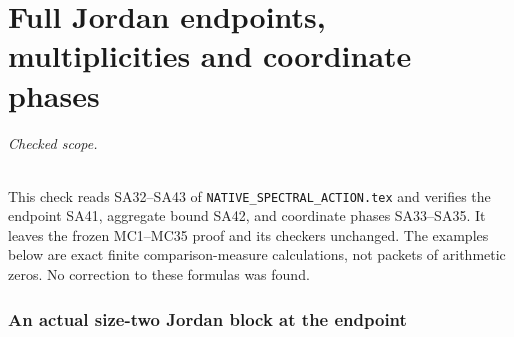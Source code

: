 \documentclass[11pt]{article}
\begin{document}
\endgroup

\clearpage\begingroup
\part*{Full Jordan endpoints, multiplicities and coordinate phases}
\newcommand{\saetr}{\operatorname{tr}}
\newcommand{\saeRes}{\operatorname{Res}}
\newcommand{\saeC}{\mathbb C}


\paragraph{Checked scope.}
This check reads SA32--SA43 of
\texttt{NATIVE\_SPECTRAL\_ACTION.tex} and verifies the endpoint
SA41, aggregate bound SA42, and coordinate phases SA33--SA35.
It leaves the frozen MC1--MC35 proof and its checkers unchanged.
The examples below are exact finite comparison-measure calculations,
not packets of arithmetic zeros. No correction to these formulas was found.

\section{An actual size-two Jordan block at the endpoint}
\end{document}
